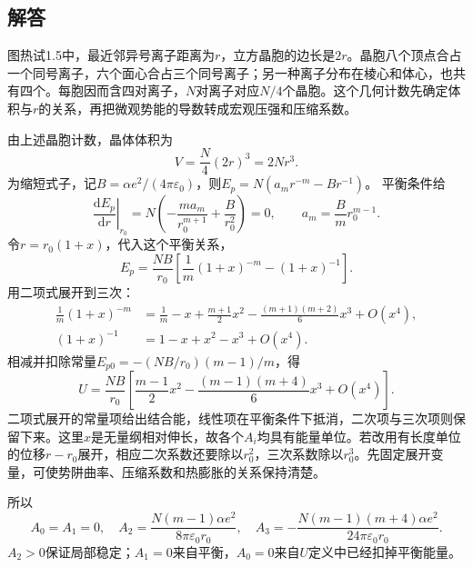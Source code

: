 \documentclass[UTF8,fontset=fandol,a4paper,11pt]{ctexart}
\begin{document}
\subsection*{解答}


图热试1.5中，最近邻异号离子距离为$r$，立方晶胞的边长是$2r$。晶胞八个顶点合占一个同号离子，六个面心合占三个同号离子；另一种离子分布在棱心和体心，也共有四个。每胞因而含四对离子，$N$对离子对应$N/4$个晶胞。这个几何计数先确定体积与$r$的关系，再把微观势能的导数转成宏观压强和压缩系数。

由上述晶胞计数，晶体体积为
\[
V=\frac N4(2r)^3=2Nr^3.
\]
为缩短式子，记$B=\alpha e^2/(4\pi\varepsilon_0)$，则$E_p=N(a_mr^{-m}-Br^{-1})$。
平衡条件给
\[
\left.\frac{\mathrm dE_p}{\mathrm dr}\right|_{r_0}
=N\left(-\frac{ma_m}{r_0^{m+1}}+\frac{B}{r_0^2}\right)=0,
\qquad
\boxed{a_m=\frac{B}{m}r_0^{m-1}}.
\]
令$r=r_0(1+x)$，代入这个平衡关系，
\[
E_p=\frac{NB}{r_0}
\left[\frac1m(1+x)^{-m}-(1+x)^{-1}\right].
\]
用二项式展开到三次：
\[
\begin{aligned}
\frac1m(1+x)^{-m}
&=\frac1m-x+\frac{m+1}{2}x^2
-\frac{(m+1)(m+2)}6x^3+O(x^4),\\
(1+x)^{-1}&=1-x+x^2-x^3+O(x^4).
\end{aligned}
\]
相减并扣除常量$E_{p0}=-(NB/r_0)(m-1)/m$，得
\[
U=\frac{NB}{r_0}\left[
\frac{m-1}{2}x^2-\frac{(m-1)(m+4)}6x^3+O(x^4)\right].
\]
二项式展开的常量项给出结合能，线性项在平衡条件下抵消，二次项与三次项则保留下来。这里$x$是无量纲相对伸长，故各个$A_i$均具有能量单位。若改用有长度单位的位移$r-r_0$展开，相应二次系数还要除以$r_0^2$，三次系数除以$r_0^3$。先固定展开变量，可使势阱曲率、压缩系数和热膨胀的关系保持清楚。

所以
\[
\boxed{A_0=A_1=0,\quad
A_2=\frac{N(m-1)\alpha e^2}{8\pi\varepsilon_0r_0},\quad
A_3=-\frac{N(m-1)(m+4)\alpha e^2}{24\pi\varepsilon_0r_0}}.
\]
$A_2>0$保证局部稳定；$A_1=0$来自平衡，$A_0=0$来自$U$定义中已经扣掉平衡能量。
\end{document}

